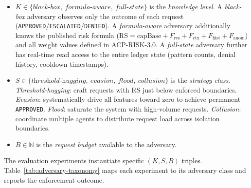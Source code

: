 \documentclass[11pt]{article}
\theoremstyle{definition}
\begin{document}
\begin{itemize}[noitemsep]
  \item $K \in \{\textit{black-box},\ \textit{formula-aware},\ \textit{full-state}\}$ is the \emph{knowledge level}.
    A \emph{black-box} adversary observes only the outcome of each request
    (\texttt{APPROVED}/\texttt{ESCALATED}/\texttt{DENIED}).
    A \emph{formula-aware} adversary additionally knows the published risk formula
    ($\mathrm{RS} = \mathrm{capBase} + F_{\mathrm{res}} + F_{\mathrm{ctx}} + F_{\mathrm{hist}} + F_{\mathrm{anom}}$)
    and all weight values defined in ACP-RISK-3.0.
    A \emph{full-state} adversary further has real-time read access to the entire ledger
    state (pattern counts, denial history, cooldown timestamps).

  \item $S \in \{\textit{threshold-hugging},\ \textit{evasion},\ \textit{flood},\ \textit{collusion}\}$ is the \emph{strategy class}.
    \emph{Threshold-hugging}: craft requests with $\mathrm{RS}$ just below enforced boundaries.
    \emph{Evasion}: systematically drive all features toward zero to achieve permanent \texttt{APPROVED}.
    \emph{Flood}: saturate the system with high-volume requests.
    \emph{Collusion}: coordinate multiple agents to distribute request load across isolation boundaries.

  \item $B \in \mathbb{N}$ is the \emph{request budget} available to the adversary.
\end{itemize}

The evaluation experiments instantiate specific $(K, S, B)$ triples.
Table~\ref{tab:adversary-taxonomy} maps each experiment to its adversary class and
reports the enforcement outcome.
\end{document}

